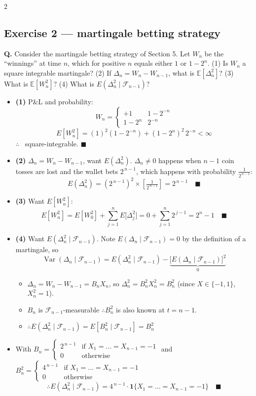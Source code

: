 \documentclass[8pt,letterpaper]{extarticle}
\begin{document}
\begin{multicols}{2}
\subsection{Exercise 2 --- martingale betting strategy}
\textbf{Q.} Consider the martingale betting strategy of Section 5. Let $W_n$ be the ``winnings'' at time $n$, which for positive $n$ equals either $1$ or $1-2^n$. (1) Is $W_n$ a square integrable martingale? (2) If $\Delta_n=W_n-W_{n-1}$, what is $\mathbb{E}[\Delta_n^2]$? (3) What is $\mathbb{E}[W_n^2]$? (4) What is $E(\Delta_n^2\mid\mathcal{F}_{n-1})$?
\begin{itemize}
  \item \textbf{(1)} P\&L and probability:
    \[ W_n=\begin{cases} +1 & 1-2^{-n} \\ 1-2^n & 2^{-n} \end{cases} \]
    \[ E[W_n^2]=(1)^2(1-2^{-n})+(1-2^n)^2\,2^{-n}<\infty \]
    $\therefore$ \checkmark\ square-integrable. $\blacksquare$
  \item \textbf{(2)} $\Delta_n=W_n-W_{n-1}$, want $E(\Delta_n^2)$. $\Delta_n\neq 0$ happens when $n-1$ coin tosses are lost and the wallet bets $2^{\,n-1}$, which happens with probability $\frac{1}{2^{\,n-1}}$:
    \[ E(\Delta_n^2)=\left(2^{\,n-1}\right)^2\times\left[\tfrac{1}{2^{\,n-1}}\right]=2^{\,n-1} \quad \blacksquare \]
  \item \textbf{(3)} Want $E[W_n^2]$:
    \[ E[W_n^2]=E[W_0^2]+\sum_{j=1}^{n}E\big[\Delta_j^2\big]=0+\sum_{j=1}^{n}2^{\,j-1}=2^n-1 \quad \blacksquare \]
  \item \textbf{(4)} Want $E(\Delta_n^2\mid\mathcal{F}_{n-1})$. Note $E(\Delta_n\mid\mathcal{F}_{n-1})=0$ by the definition of a martingale, so
    \[ \operatorname{Var}(\Delta_n\mid\mathcal{F}_{n-1})=E(\Delta_n^2\mid\mathcal{F}_{n-1})-\underbrace{\big[E(\Delta_n\mid\mathcal{F}_{n-1})\big]^2}_{0} \]
    \begin{itemize}
      \item $\Delta_n=W_n-W_{n-1}=B_nX_n$, so $\Delta_n^2=B_n^2X_n^2=B_n^2$ (since $X\in\{-1,1\}$, $X_n^2=1$).
      \item $B_n$ is $\mathcal{F}_{n-1}$-measurable $\therefore B_n^2$ is also known at $t=n-1$.
      \item $\therefore E(\Delta_n^2\mid\mathcal{F}_{n-1})=E[B_n^2\mid\mathcal{F}_{n-1}]=B_n^2$
    \end{itemize}
  \item With $B_n=\begin{cases}2^{\,n-1} & \text{if } X_1=\dots=X_{n-1}=-1\\ 0 & \text{otherwise}\end{cases}$ and $B_n^2=\begin{cases}4^{\,n-1} & \text{if } X_1=\dots=X_{n-1}=-1\\ 0 & \text{otherwise}\end{cases}$
    \[ \therefore E(\Delta_n^2\mid\mathcal{F}_{n-1})=4^{\,n-1}\cdot\mathbf{1}\{X_1=\dots=X_{n-1}=-1\} \quad \blacksquare \]
\end{itemize}

\end{multicols}
\end{document}
